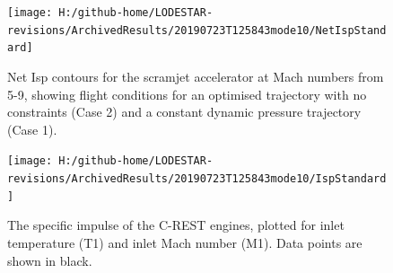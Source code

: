 \begin{figure}[ht!]%
	\centering
	\texttt{[image: H:/github-home/LODESTAR-revisions/ArchivedResults/20190723T125843mode10/NetIspStandard]}
	\caption{Net Isp contours for the scramjet accelerator at Mach numbers from 5-9, showing flight conditions for an optimised trajectory with no constraints (Case 2) and a constant dynamic pressure trajectory (Case 1). }
	\label{fig:NetIspStandardNoReturn}
\end{figure}

\begin{figure}[ht!]%
	\centering
	\texttt{[image: H:/github-home/LODESTAR-revisions/ArchivedResults/20190723T125843mode10/IspStandard]}
	\caption{The specific impulse of the C-REST engines, plotted for inlet temperature (T1) and inlet Mach number (M1). Data points are shown in black.}
	\label{fig:IspStandard}
\end{figure}


